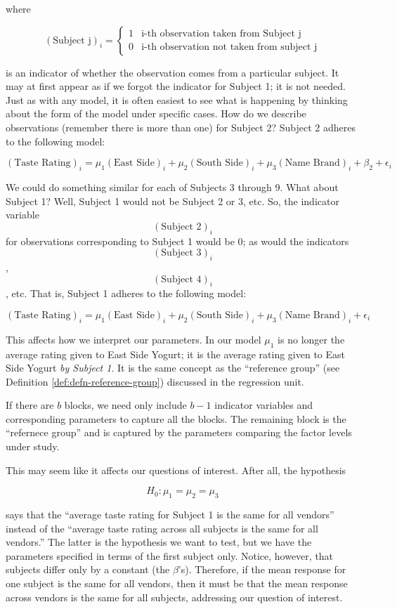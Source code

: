 \documentclass[]{book}
\theoremstyle{plain}
\theoremstyle{mydefn}
\theoremstyle{myexmpl}
\theoremstyle{remark}
\let\BeginKnitrBlock\begin \let\EndKnitrBlock\end
\let\BeginKnitrBlock\begin \let\EndKnitrBlock\end
\begin{document}
where

\[(\text{Subject j})_i = \begin{cases}
  1 & \text{i-th observation taken from Subject j} \\
  0 & \text{i-th observation not taken from subject j}
  \end{cases}\]

is an indicator of whether the observation comes from a particular
subject. It may at first appear as if we forgot the indicator for
Subject 1; it is not needed. Just as with any model, it is often easiest
to see what is happening by thinking about the form of the model under
specific cases. How do we describe observations (remember there is more
than one) for Subject 2? Subject 2 adheres to the following model:

\[(\text{Taste Rating})_i = \mu_1 (\text{East Side})_i + \mu_2 (\text{South Side})_i + \mu_3 (\text{Name Brand})_i + \beta_2 + \epsilon_i\]

We could do something similar for each of Subjects 3 through 9. What
about Subject 1? Well, Subject 1 would not be Subject 2 or 3, etc. So,
the indicator variable \[(\text{Subject 2})_i\] for observations
corresponding to Subject 1 would be 0; as would the indicators
\[(\text{Subject 3})_i\], \[(\text{Subject 4})_i\], etc. That is,
Subject 1 adheres to the following model:

\[(\text{Taste Rating})_i = \mu_1 (\text{East Side})_i + \mu_2 (\text{South Side})_i + \mu_3 (\text{Name Brand})_i + \epsilon_i\]

This affects how we interpret our parameters. In our model \(\mu_1\) is
no longer the average rating given to East Side Yogurt; it is the
average rating given to East Side Yogurt \emph{by Subject 1}. It is the
same concept as the ``reference group'' (see Definition
\ref{def:defn-reference-group}) discussed in the regression unit.

\BeginKnitrBlock{rmdtip}
If there are \(b\) blocks, we need only include \(b-1\) indicator
variables and corresponding parameters to capture all the blocks. The
remaining block is the ``refernece group'' and is captured by the
parameters comparing the factor levels under study.
\EndKnitrBlock{rmdtip}

This may seem like it affects our questions of interest. After all, the
hypothesis

\[H_0: \mu_1 = \mu_2 = \mu_3\]

says that the ``average taste rating for Subject 1 is the same for all
vendors'' instead of the ``average taste rating across all subjects is
the same for all vendors.'' The latter is the hypothesis we want to
test, but we have the parameters specified in terms of the first subject
only. Notice, however, that subjects differ only by a constant (the
\(\beta\)'s). Therefore, if the mean response for one subject is the
same for all vendors, then it must be that the mean response across
vendors is the same for all subjects, addressing our question of
interest.
\end{document}
